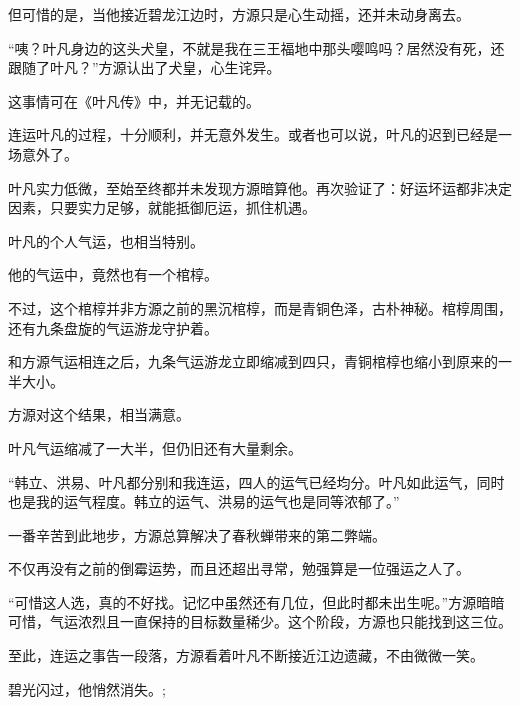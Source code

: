 \begin{this_body}
但可惜的是，当他接近碧龙江边时，方源只是心生动摇，还并未动身离去。

“咦？叶凡身边的这头犬皇，不就是我在三王福地中那头嘤鸣吗？居然没有死，还跟随了叶凡？”方源认出了犬皇，心生诧异。

这事情可在《叶凡传》中，并无记载的。

连运叶凡的过程，十分顺利，并无意外发生。或者也可以说，叶凡的迟到已经是一场意外了。

叶凡实力低微，至始至终都并未发现方源暗算他。再次验证了：好运坏运都非决定因素，只要实力足够，就能抵御厄运，抓住机遇。

叶凡的个人气运，也相当特别。

他的气运中，竟然也有一个棺椁。

不过，这个棺椁并非方源之前的黑沉棺椁，而是青铜色泽，古朴神秘。棺椁周围，还有九条盘旋的气运游龙守护着。

和方源气运相连之后，九条气运游龙立即缩减到四只，青铜棺椁也缩小到原来的一半大小。

方源对这个结果，相当满意。

叶凡气运缩减了一大半，但仍旧还有大量剩余。

“韩立、洪易、叶凡都分别和我连运，四人的运气已经均分。叶凡如此运气，同时也是我的运气程度。韩立的运气、洪易的运气也是同等浓郁了。”

一番辛苦到此地步，方源总算解决了春秋蝉带来的第二弊端。

不仅再没有之前的倒霉运势，而且还超出寻常，勉强算是一位强运之人了。

“可惜这人选，真的不好找。记忆中虽然还有几位，但此时都未出生呢。”方源暗暗可惜，气运浓烈且一直保持的目标数量稀少。这个阶段，方源也只能找到这三位。

至此，连运之事告一段落，方源看着叶凡不断接近江边遗藏，不由微微一笑。

碧光闪过，他悄然消失。;

\end{this_body}

